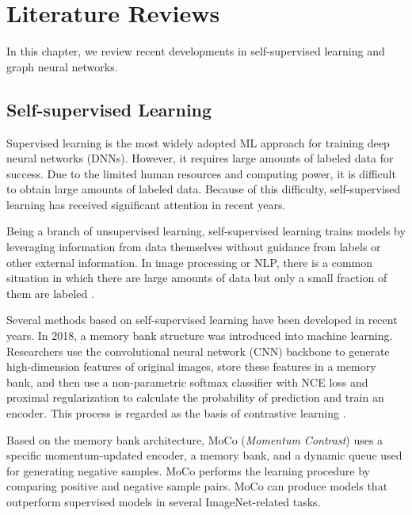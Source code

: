 

\chapter{Literature Reviews}

In this chapter, we review recent developments in self-supervised learning and graph neural networks.  



\section{Self-supervised Learning}

Supervised learning is the most widely adopted ML approach for training deep neural networks (DNNs). However, it requires large amounts of labeled data for success. Due to the limited human resources and computing power, it is difficult to obtain large amounts of labeled data. Because of this difficulty, self-supervised learning has received significant attention in recent years. 

Being a branch of unsupervised learning, self-supervised learning trains models by leveraging information from data themselves without guidance from labels or other external information. In image processing or NLP, there is a common situation in which there are large amounts of data but only a small fraction of them are labeled \cite{zhu2021empirical}. 

Several methods based on self-supervised learning have been developed in recent years. In 2018, a memory bank \cite{MemoryBank} structure was introduced into machine learning. Researchers use the convolutional neural network (CNN) backbone to generate high-dimension features of original images, store these features in a memory bank, and then use a non-parametric softmax classifier with NCE loss and proximal regularization to calculate the probability of prediction and train an encoder. This process is regarded as the basis of contrastive learning \cite{hassani2020contrastive}.


Based on the memory bank architecture, MoCo (\textit{Momentum Contrast}) \cite{MoCo, MoCov2} uses a specific momentum-updated encoder, a memory bank, and a dynamic queue used for generating negative samples. MoCo performs the learning procedure by comparing positive and negative sample pairs. MoCo can produce models that outperform supervised models in several ImageNet-related tasks. 

